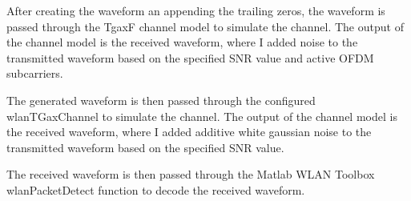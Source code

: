 After creating the waveform an appending the trailing zeros, the waveform is passed through the TgaxF channel model to simulate the channel.
The output of the channel model is the received waveform, where I added noise to the transmitted waveform based on the
specified \ac{SNR} value and active \ac{OFDM} subcarriers.

The generated waveform is then passed through the configured wlanTGaxChannel to simulate the channel. The output of the channel model is the received waveform, where
I added additive white gaussian noise to the transmitted waveform based on the specified \ac{SNR} value.

The received waveform is then passed through the Matlab WLAN Toolbox wlanPacketDetect function  to decode the received waveform.
